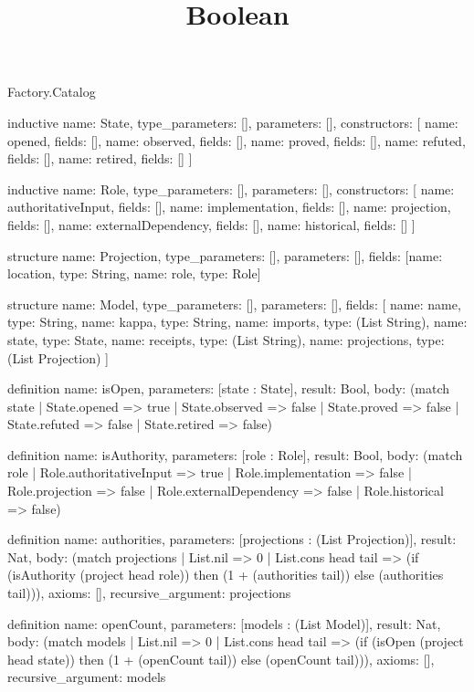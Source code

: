\begin{lexlean}{Factory.Catalog}
\title{Boolean}
\begin{semanticmodule}
inductive{
  name: State,
  type_parameters: [],
  parameters: [],
  constructors: [
    {name: opened, fields: []},
    {name: observed, fields: []},
    {name: proved, fields: []},
    {name: refuted, fields: []},
    {name: retired, fields: []}
  ]
}

inductive{
  name: Role,
  type_parameters: [],
  parameters: [],
  constructors: [
    {name: authoritativeInput, fields: []},
    {name: implementation, fields: []},
    {name: projection, fields: []},
    {name: externalDependency, fields: []},
    {name: historical, fields: []}
  ]
}

structure{
  name: Projection,
  type_parameters: [],
  parameters: [],
  fields: [{name: location, type: String}, {name: role, type: Role}]
}

structure{
  name: Model,
  type_parameters: [],
  parameters: [],
  fields: [
    {name: name, type: String},
    {name: kappa, type: String},
    {name: imports, type: (List String)},
    {name: state, type: State},
    {name: receipts, type: (List String)},
    {name: projections, type: (List Projection)}
  ]
}

definition{
  name: isOpen,
  parameters: [state : State],
  result: Bool,
  body: (match state
    | State.opened => true
    | State.observed => false
    | State.proved => false
    | State.refuted => false
    | State.retired => false)
}

definition{
  name: isAuthority,
  parameters: [role : Role],
  result: Bool,
  body: (match role
    | Role.authoritativeInput => true
    | Role.implementation => false
    | Role.projection => false
    | Role.externalDependency => false
    | Role.historical => false)
}

definition{
  name: authorities,
  parameters: [projections : (List Projection)],
  result: Nat,
  body: (match projections
    | List.nil => 0
    | List.cons head tail => (if (isAuthority (project head role)) then (1 + (authorities tail)) else (authorities tail))),
  axioms: [],
  recursive_argument: projections
}

definition{
  name: openCount,
  parameters: [models : (List Model)],
  result: Nat,
  body: (match models
    | List.nil => 0
    | List.cons head tail => (if (isOpen (project head state)) then (1 + (openCount tail)) else (openCount tail))),
  axioms: [],
  recursive_argument: models
}


\end{semanticmodule}
\end{lexlean}
